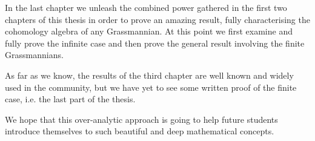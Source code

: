 In the last chapter we unleash the combined power gathered in the first two chapters of this thesis in order to prove an amazing result, fully characterising the cohomology algebra of any Grassmannian. At this point we first examine and fully prove the infinite case and then prove the general result involving the finite Grassmannians.

As far as we know, the results of the third chapter are well known and widely used in the community, but we have yet to see some written proof of the finite case, i.e. the last part of the thesis.

We hope that this over-analytic approach is going to help future students introduce themselves to such beautiful and deep mathematical concepts.
